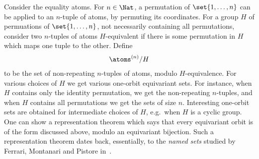 \begin{ourexample} Consider the equality atoms. For $n \in \Nat$, a permutation of $\set{1,\ldots,n}$ can be applied to an $n$-tuple of atoms, by permuting its coordinates. For a group $H$ of permuations of $\set{1,\ldots,n}$, not necessarily containing all permutations, consider two $n$-tuples of atoms $H$-equivalent if there is some permutation in $H$ which maps one tuple to the other. Define
	\begin{align*}
		\atoms^{(n)} / H
	\end{align*}to be	the set of non-repeating $n$-tuples of atoms, modulo $H$-equivalence. For various choices of $H$ we get various one-orbit equivariant sets. For instance, when $H$ contains only the identity permutation, we get the non-repeating $n$-tuples, and when $H$ contains all permutations we get the sets of size $n$. Interesting one-orbit sets are obtained for intermediate choices of $H$, e.g.~when $H$ is a cyclic group. One can show a representation theorem which says that every equivariant orbit is of the form discussed above, modulo an equivariant bijection. Such a representation theorem dates back, essentially, to the \emph{named sets} studied by Ferrari, Montanari and Pistore in~\cite{DBLP:conf/fossacs/FerrariMP02}.
\end{ourexample}

